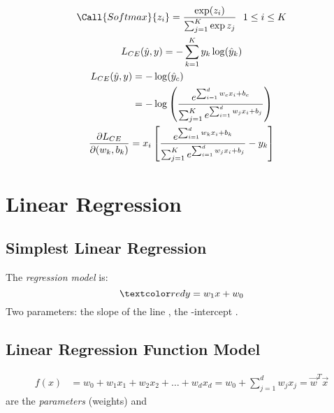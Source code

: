 \documentclass[
	exam={Midterm}
]{cs584exam}
\begin{document}
\begin{gather}
	\Call{Softmax}{z_{i}} = \frac{\exp(z_{i})}{\sum_{j=1}^{K} \exp{z_{j}}}\ \ 1 \leq i \leq K\\
	\label{eq:multinomial-softmax}
	L_{CE}(\hat{y}, y) = -\sum_{k=1}^{K} y_{k} \log(\hat{y}_{k}) \\
	\begin{aligned}
		L_{CE}(\hat{y}, y) &= -\log(\hat{y}_{c})\\
		&= -\log\left( \frac{e^{\sum_{i=1}^{d} w_{c}x_{i} + b_{c}}}{\sum_{j=1}^{K} e^{\sum_{i=1}^{d} w_{j}x_{i} + b_{j}}} \right)
	\end{aligned}\\
	\label{eq:multinomial-loss}
	\frac{\partial L_{CE}}{\partial (w_{k}, b_{k})} = x_{i}\left[ \frac{e^{\sum_{i=1}^{d} w_{k}x_{i} + b_{k}}}{\sum_{j=1}^{K} e^{\sum_{i=1}^{d} w_{j}x_{i} + b_{j}}} - y_{k} \right]
\end{gather}

\chapter{Linear Regression}\label{ch:linear-regression}
\section{Simplest Linear Regression}\label{sec:simplest-linear-regression}
The \emph{regression model} is: \[ \data{ y = w_{1}x + w_{0} } \]
Two parameters: the slope of the line , the -intercept .

\section{Linear Regression Function Model}\label{sec:linear-regression-function-model}
\begin{equation*}
	\begin{aligned}
		f(x) &= w_{0} + w_{1}x_{1} + w_{2}x_{2} + \dots + w_{d}x_{d}
		= w_{0} + \sum_{j=1}^{d} w_{j}x_{j}
		= \vec{w}^{T}\vec{x}
	\end{aligned}
\end{equation*}
 are the \emph{parameters} (weights) and 
\end{document}
